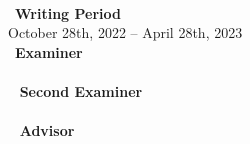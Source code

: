 \thispagestyle{empty}
\ \vfill \ \\  %
\
\textbf{Writing Period}            \smallskip{} \\
October 28th, 2022 -- April 28th, 2023   \bigskip{} \\
\
\textbf{Examiner}                  \smallskip{} \\
\firstexaminer                     \bigskip{} \\
\
\ifdef{\secondexaminer}
	{
	\textbf{Second Examiner}       \smallskip{} \\
	\secondexaminer                \bigskip{} \\
	\
	}
	{
	}
\textbf{Advisor}                  \smallskip{} \\
\advisers